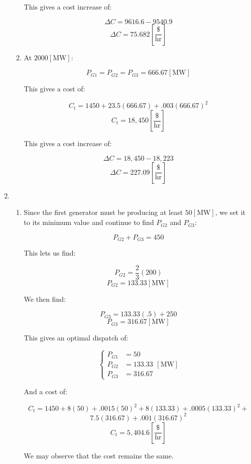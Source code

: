 \begin{enumerate}
\begin{enumerate}
        This gives a cost increase of:

        $$\Delta C=9616.6-9540.9$$
        $$\boxed{\Delta C=75.682\left[ \frac{\$}{\text{hr}} \right]}$$

      \item At $2000[\si{\mega\watt}]$:

        $$P_{G1}=P_{G2}=P_{G3}=666.67[\si{\mega\watt}]$$

        This gives a cost of:

        $$C_t=1450+23.5(666.67)+.003(666.67)^2$$
        $$\boxed{C_t=18,450\left[ \frac{\$}{\text{hr}} \right]}$$

        This gives a cost increase of:

        $$\Delta C=18,450-18,223$$
        $$\boxed{\Delta C=227.09\left[ \frac{\$}{\text{hr}} \right]}$$

    \end{enumerate}

  \item

    \begin{enumerate}

      \item Since the first generator must be producing at least $50[\si{\mega\watt}]$, we set it to its minimum value and continue to find $P_{G2}$ and $P_{G3}$:

        $$P_{G2}+P_{G3}=450$$

        This lets us find:

        $$P_{G2}=\frac{2}{3}(200)$$
        $$P_{G2}=133.33[\si{\mega\watt}]$$

        We then find:

        $$P_{G3}=133.33(.5)+250$$
        $$\boxed{P_{G3}=316.67[\si{\mega\watt}]}$$

        This gives an optimal dispatch of:

        $$\boxed{\left\{\begin{array}{ll} P_{G1}&= 50\\P_{G2}&= 133.33\\P_{G3}&= 316.67\end{array}[\si{\mega\watt}]}$$

        And a cost of:

        $$C_t=1450+8(50)+.0015(50)^2+8(133.33)+.0005(133.33)^2+$$
        $$7.5(316.67)+.001(316.67)^2$$
        $$\boxed{C_t=5,404.6\left[ \frac{\$}{\text{hr}} \right]}$$

        We may observe that the cost remains the same.


\end{enumerate}
\end{enumerate}
